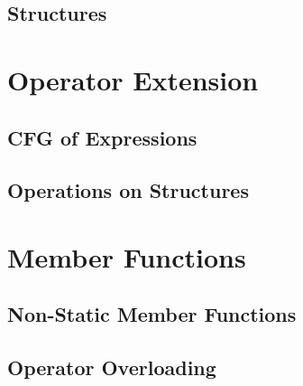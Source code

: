 \documentclass{beamer}
\begin{document}
\subsection{Structures}

\section{Operator Extension}

\subsection{CFG of Expressions}

\subsection{Operations on Structures}

\section{Member Functions}

\subsection{Non-Static Member Functions}

\subsection{Operator Overloading}
\end{document}
